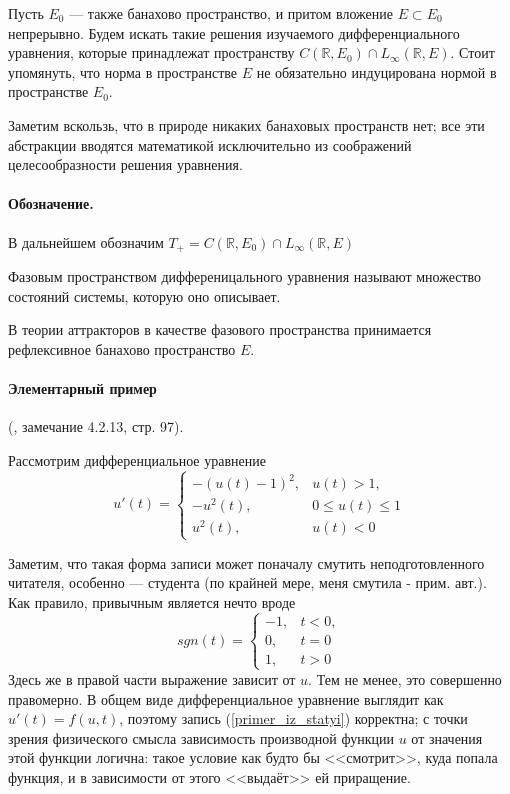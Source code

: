 Пусть $E_0$ --- также банахово пространство, и притом вложение $E \subset E_0$ непрерывно.
Будем искать такие решения изучаемого дифференциального уравнения, которые принадлежат пространству $C(\mathbb{R},E_0) \cap L_\infty(\mathbb{R},E)$.
Стоит упомянуть, что норма в пространстве $E$ не обязательно индуцирована нормой в пространстве $E_0$.

Заметим вскользь, что в природе никаких банаховых пространств нет; все эти абстракции вводятся математикой исключительно из соображений целесообразности решения уравнения.

\paragraph{Обозначение.}
В дальнейшем обозначим $T_+ = C(\mathbb{R},E_0) \cap L_\infty(\mathbb{R},E)$

\opred
Фазовым пространством дифференицального уравнения называют множество состояний системы, которую оно описывает.

В теории аттракторов в качестве фазового пространства принимается рефлексивное банахово пространство $E$.


\paragraph{Элементарный пример} (\cite{Vorotnikov}, замечание 4.2.13, стр. 97).

Рассмотрим дифференциальное уравнение
\begin{equation}\label{primer_iz_statyi}
	u'(t)=
	\left\{
		\begin{array}{ll}
			-(u(t)-1)^2, & u(t) > 1, \\
			-u^2 (t)   , & 0 \leq u(t) \leq 1 \\
			u^2 (t)    , & u(t) < 0
		\end{array}
	\right.
\end{equation}

Заметим, что такая форма записи может поначалу смутить неподготовленного читателя, особенно --- студента (по крайней мере, меня смутила - прим. авт.).
Как правило, привычным является нечто вроде
\begin{equation*}
	sgn(t)=
	\left\{
		\begin{array}{ll}
			-1, & t < 0, \\
			 0, & t = 0 \\
			 1, & t > 0
		\end{array}
	\right.
\end{equation*}
Здесь же в правой части выражение зависит от $u$.
Тем не менее, это совершенно правомерно.
В общем виде дифференциальное уравнение выглядит как $u'(t)=f(u,t)$,
поэтому запись (\ref{primer_iz_statyi}) корректна;
с точки зрения физического смысла зависимость производной функции $u$ от значения этой функции логична:
такое условие как будто бы <<смотрит>>, куда попала функция, и в зависимости от этого <<выдаёт>> ей приращение.


